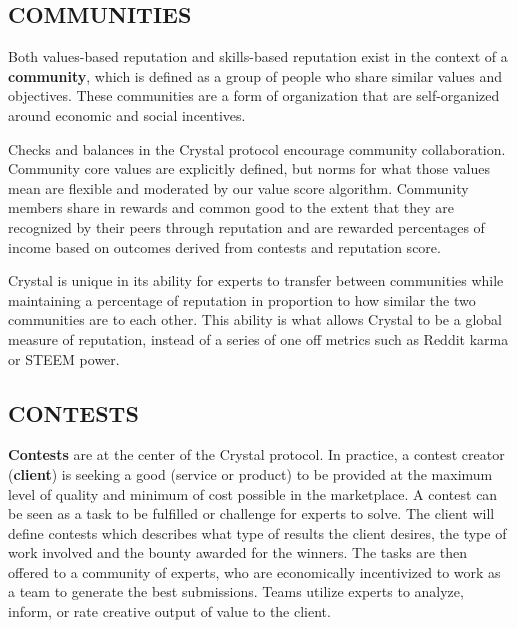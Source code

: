 \subsection{\texorpdfstring{\protect\hypertarget{_tzgn4l15n5pq}{}{\protect\hypertarget{_Toc462050404}{}{}}COMMUNITIES}{COMMUNITIES}}\label{communities}

Both values-based reputation and skills-based reputation exist in the
context of a \textbf{community}, which is defined as a group of people
who share similar values and objectives. These communities are a form of
organization that are self-organized around economic and social
incentives.

Checks and balances in the Crystal protocol encourage community
collaboration. Community core values are explicitly defined, but norms
for what those values mean are flexible and moderated by our value score
algorithm. Community members share in rewards and common good to the
extent that they are recognized by their peers through reputation and
are rewarded percentages of income based on outcomes derived from
contests and reputation score.

Crystal is unique in its ability for experts to transfer between
communities while maintaining a percentage of reputation in proportion
to how similar the two communities are to each other. This ability is
what allows Crystal to be a global measure of reputation, instead of a
series of one off metrics such as Reddit karma or STEEM power.

\subsection{\texorpdfstring{\protect\hypertarget{_bj4o04lm6m5u}{}{\protect\hypertarget{_Toc462050405}{}{}}CONTESTS}{CONTESTS}}\label{contests}

\textbf{Contests} are at the center of the Crystal protocol. In
practice, a contest creator (\textbf{client}) is seeking a good (service
or product) to be provided at the maximum level of quality and minimum
of cost possible in the marketplace. A contest can be seen as a task to
be fulfilled or challenge for experts to solve. The client will define
contests which describes what type of results the client desires, the
type of work involved and the bounty awarded for the winners. The tasks
are then offered to a community of experts, who are economically
incentivized to work as a team to generate the best submissions. Teams
utilize experts to analyze, inform, or rate creative output of value to
the client.

